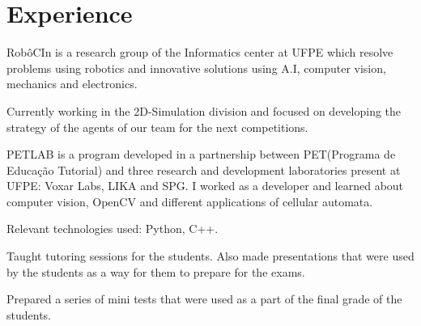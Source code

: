 \documentclass[]{deedy-resume-openfont}
\begin{document}
\hfill
\begin{minipage}[t]{0.66\textwidth} 


\section{Experience}

\vspace{\topsep} %
\begin{tightemize}
\item RobôCIn is a research group of the Informatics center at UFPE which resolve problems using
robotics and innovative solutions using A.I, computer vision, mechanics and electronics.
\item Currently working in the 2D-Simulation division and focused on developing the strategy of the agents of our team for the next competitions.
\end{tightemize}
\vspace{2mm}

\vspace{\topsep} %
\begin{tightemize}
\item PETLAB is a program developed in a partnership between PET(Programa de Educação Tutorial) and
 three research and development laboratories present at UFPE: Voxar Labs, LIKA and SPG. I worked as a developer and learned about computer vision, OpenCV and  different applications of cellular automata.
\item Relevant technologies used: Python, C++.
\end{tightemize}
\vspace{2mm}

\begin{tightemize}
\item Taught tutoring sessions for the students. Also made presentations that were used by the students as a way for them to prepare for the exams.
\item Prepared a series of mini tests that were used as a part of the final grade of the students.
\end{tightemize}


\end{minipage}
\end{document}
